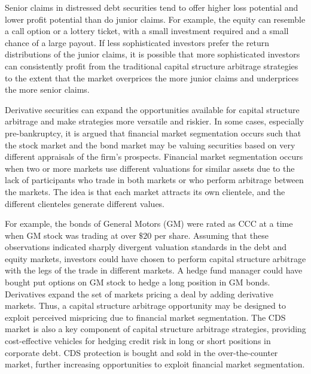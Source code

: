 \documentclass[11pt]{article}
\begin{document}
Senior claims in distressed debt securities tend to offer higher loss potential and lower profit potential than do junior claims. For example, the equity can resemble a call option or a lottery ticket, with a small investment required and a small chance of a large payout. If less sophisticated investors prefer the return distributions of the junior claims, it is possible that more sophisticated investors can consistently profit from the traditional capital structure arbitrage strategies to the extent that the market overprices the more junior claims and underprices the more senior claims.

Derivative securities can expand the opportunities available for capital structure arbitrage and make strategies more versatile and riskier. In some cases, especially pre-bankruptcy, it is argued that financial market segmentation occurs such that the stock market and the bond market may be valuing securities based on very different appraisals of the firm's prospects. Financial market segmentation occurs when two or more markets use different valuations for similar assets due to the lack of participants who trade in both markets or who perform arbitrage between the markets. The idea is that each market attracts its own clientele, and the different clienteles generate different values.

For example, the bonds of General Motors (GM) were rated as CCC at a time when GM stock was trading at over $\$ 20$ per share. Assuming that these observations indicated sharply divergent valuation standards in the debt and equity markets, investors could have chosen to perform capital structure arbitrage with the legs of the trade in different markets. A hedge fund manager could have bought put options on GM stock to hedge a long position in GM bonds. Derivatives expand the set of markets pricing a deal by adding derivative markets. Thus, a capital structure arbitrage opportunity may be designed to exploit perceived mispricing due to financial market segmentation. The CDS market is also a key component of capital structure arbitrage strategies, providing cost-effective vehicles for hedging credit risk in long or short positions in corporate debt. CDS protection is bought and sold in the over-the-counter market, further increasing opportunities to exploit financial market segmentation.
\end{document}
